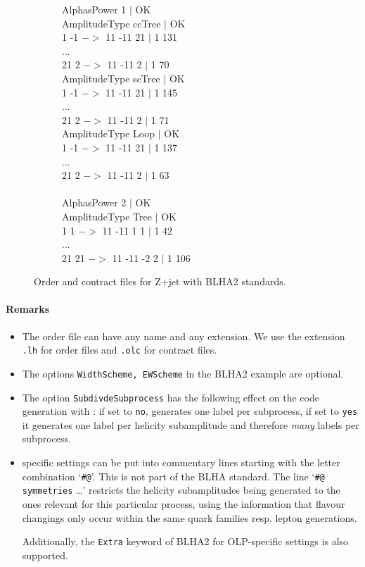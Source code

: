 \begin{figure}[h]
\begin{subfigure}[]{0.49\textwidth}
{{AlphasPower 1 $|$ OK\\
AmplitudeType ccTree $|$ OK\\
1 -1 $->$ 11 -11 21 $|$ 1 131\\
...\\
21 2 $->$ 11 -11 2 $|$ 1 70\\
AmplitudeType scTree | OK\\
1 -1 $->$ 11 -11 21 $|$ 1 145\\
...\\
21 2 $->$ 11 -11 2 $|$ 1 71\\
AmplitudeType Loop $|$ OK\\
1 -1 $->$ 11 -11 21 $|$ 1 137\\
...\\
21 2 $->$ 11 -11 2 $|$ 1 63\\
\\
AlphasPower 2 $|$ OK\\
AmplitudeType Tree $|$ OK\\
1 1 $->$ 11 -11 1 1 $|$ 1 42\\
...\\
21 21 $->$ 11 -11 -2 2 $|$ 1 106\\}
}
\end{subfigure}
\caption{Order and contract files for Z+jet with BLHA2 standards.}
\label{fig:BLHA2}
\end{figure}  

\paragraph{Remarks}
\begin{itemize}
\item The order file can have any name and any extension.
      We use  the extension \texttt{.lh}
      for order files and \texttt{.olc} for contract files.
\item The options \texttt{WidthScheme, EWScheme} in the BLHA2  example are optional.
\item The option \texttt{SubdivdeSubprocess}  has the following effect
      on the code generation with \gosam{}: if set to 
      \texttt{no}, \gosam{} generates one label per subprocess, if set to
      \texttt{yes} it generates one label per helicity subamplitude
      and therefore \emph{many} labels per subprocess.
      
\item \gosam{} specific settings can be put into commentary lines starting
      with the letter combination `\texttt{\#@}'. This is not part of the
      BLHA standard. The line `\texttt{\#@ symmetries} \dots' restricts the
      helicity subamplitudes being generated to the ones relevant for this
      particular process, using the information that flavour changings only occur within 
      the same quark families resp. lepton generations.

      Additionally, the \texttt{Extra} keyword of BLHA2 for OLP-specific settings is also supported.
\end{itemize}

